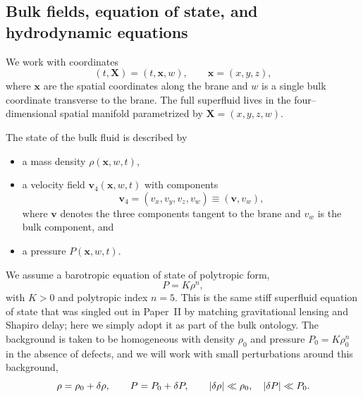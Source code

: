 \documentclass[12pt]{article}
\begin{document}
\subsection{Bulk fields, equation of state, and hydrodynamic equations}
\label{subsec:bulk_fields}

We work with coordinates
\begin{equation}
  (t,\mathbf{X}) = (t,\mathbf{x},w),
  \qquad
  \mathbf{x} = (x,y,z),
\end{equation}
where $\mathbf{x}$ are the spatial coordinates along the brane and $w$ is a
single bulk coordinate transverse to the brane.  The full superfluid lives
in the four--dimensional spatial manifold parametrized by
$\mathbf{X} = (x,y,z,w)$.

The state of the bulk fluid is described by
\begin{itemize}
  \item a mass density $\rho(\mathbf{x},w,t)$,
  \item a velocity field
    $\mathbf{v}_4(\mathbf{x},w,t)$ with components
    \begin{equation}
      \mathbf{v}_4
      = (v_x,v_y,v_z,v_w)
      \equiv (\mathbf{v},v_w),
    \end{equation}
    where $\mathbf{v}$ denotes the three components tangent to the brane and
    $v_w$ is the bulk component, and
  \item a pressure $P(\mathbf{x},w,t)$.
\end{itemize}

We assume a barotropic equation of state of polytropic form,
\begin{equation}
  P = K \rho^n,
  \label{eq:poly_eos}
\end{equation}
with $K>0$ and polytropic index $n=5$.  This is the same stiff superfluid
equation of state that was singled out in Paper~II by matching gravitational
lensing and Shapiro delay; here we simply adopt it as part of the bulk
ontology.  The background is taken to be homogeneous with density $\rho_0$
and pressure $P_0 = K\rho_0^n$ in the absence of defects, and we will work
with small perturbations around this background,
\begin{equation}
  \rho = \rho_0 + \delta\rho,
  \qquad
  P = P_0 + \delta P,
  \qquad
  \abs{\delta\rho} \ll \rho_0,
  \quad
  \abs{\delta P} \ll P_0.
\end{equation}
\end{document}
